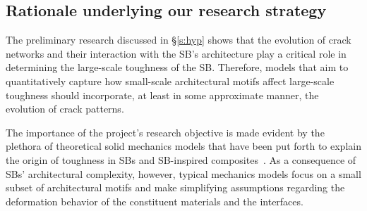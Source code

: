 \documentclass[10pt,letterpaper]{article}
\begin{document}
  \subsection{Rationale underlying our research strategy}
    \label{s:rationale}
    The preliminary research discussed in \S \ref{s:hyp} shows that the evolution of crack networks and their interaction with the SB's architecture play a critical role in determining the large-scale toughness of the SB. Therefore, models that aim to quantitatively capture how small-scale architectural motifs affect large-scale toughness should incorporate, at least in some approximate manner, the evolution of crack patterns.

    The importance of the project's research objective is made evident by the plethora of theoretical solid mechanics models that have been put forth to explain the origin of toughness in SBs and SB-inspired composites~\cite{barthelat2007mechanics,smith1999molecular,meyers2008mechanical,li2004nanoscale,lin2006mechanical,chen2013bio}. As a consequence of SBs' architectural complexity, however, typical mechanics models focus on a small subset of architectural motifs and make simplifying assumptions regarding the deformation behavior of the constituent materials and the interfaces.
\end{document}
